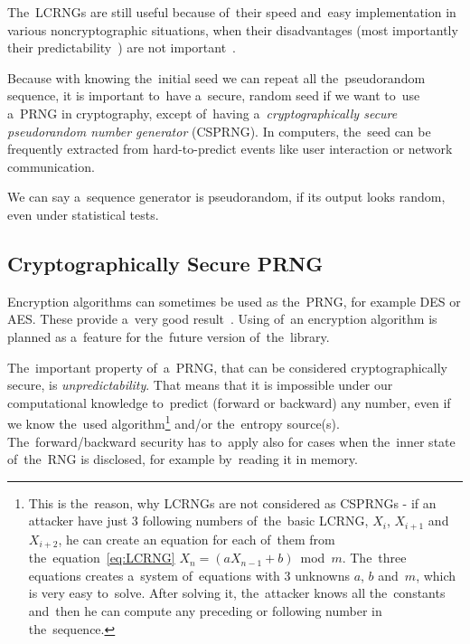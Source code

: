 \par{
The~LCRNGs are still useful because of~their speed and~easy implementation 
in various noncryptographic situations, when their disadvantages 
(most importantly their predictability~\cite[p.~152, 153]
{CryptographyAndNetworkSecurity}) 
are not important~\cite[chapter~16.1]{AppliedCryptography}.
}

\par{
Because with knowing the~initial seed we can repeat all the~pseudorandom 
sequence, it is important to~have a~secure, random seed if we want to~use 
a~PRNG in cryptography, except of~having a~{\em cryptographically secure 
pseudorandom number generator} (CSPRNG). In computers, the~seed 
can be frequently extracted from hard-to-predict events like user interaction 
or network communication.
}

\par{
We can say a~sequence generator is pseudorandom, if its output looks random, 
even under statistical tests.
}
\newpage
\subsection{Cryptographically Secure PRNG}
\par{
Encryption algorithms can sometimes be used as the~PRNG,
 for example DES or AES. These provide a~very good 
 result~\cite[p.~153-156]{CryptographyAndNetworkSecurity}. 
 Using of~an encryption algorithm is planned as a~feature for the~future version 
 of~the~library.
}

\par{
The~important property of~a~PRNG, that can be considered cryptographically 
secure, is {\em unpredictability}. That means that it is impossible under our 
computational knowledge to~predict (forward or backward) any number, even if 
we know the~used algorithm\footnote{This is the~reason, why LCRNGs are not 
considered as CSPRNGs - if an attacker have just 3 following numbers 
of~the~basic LCRNG, $X_{i}$, $X_{i+1}$ and~$X_{i+2}$, he can create 
an equation for each of~them from the~equation~\ref{eq:LCRNG} 
$X_n = (aX_{n-1} + b)$~mod~$m$. The~three equations creates a~system 
of~equations with 3 unknowns $a$, $b$ and~$m$, which is very easy to~solve. 
After solving it, the~attacker knows all the~constants and~then he can compute 
any preceding or following number in the~sequence.} and/or the~entropy 
source(s). The~forward/backward security has to~apply also for cases when 
the~inner state of~the~RNG is disclosed, for example by~reading it in memory.
}

